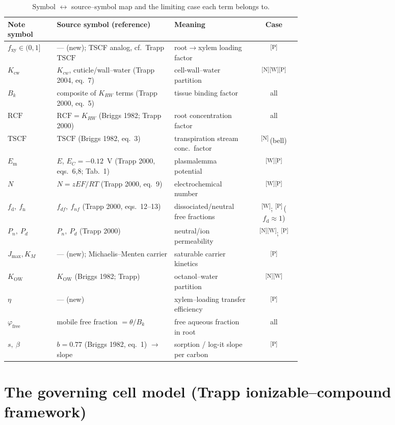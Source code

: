 \documentclass[11pt]{article}
\newcommand{\cN}{\textsuperscript{\textcolor{cNcol}{[N]}}}
\newcommand{\cW}{\textsuperscript{\textcolor{cWcol}{[W]}}}
\newcommand{\cP}{\textsuperscript{\textcolor{cPcol}{[P]}}}
\newcommand{\fxy}{\ensuremath{f_{\mathrm{xy}}}}
\newcommand{\Kcw}{\ensuremath{K_{\mathrm{cw}}}}
\newcommand{\Bk}{\ensuremath{B_{k}}}
\newcommand{\Em}{\ensuremath{E_{\mathrm{m}}}}
\newcommand{\fd}{\ensuremath{f_{\mathrm{d}}}}
\newcommand{\fnn}{\ensuremath{f_{\mathrm{n}}}}
\newcommand{\Kow}{\ensuremath{K_{\mathrm{OW}}}}
\newcommand{\TSCF}{\ensuremath{\mathrm{TSCF}}}
\newcommand{\RCF}{\ensuremath{\mathrm{RCF}}}
\newcommand{\ffree}{\ensuremath{\varphi_{\mathrm{free}}}}
\begin{document}
\begin{table}[h]
\centering\small
\renewcommand{\arraystretch}{1.15}
\caption{Symbol $\leftrightarrow$ source--symbol map and the limiting case each term belongs to.}
\label{tab:sym}
\begin{tabular}{@{}l >{\raggedright\arraybackslash}p{0.40\linewidth} >{\raggedright\arraybackslash}p{0.27\linewidth} c@{}}
\toprule
Note symbol & Source symbol (reference) & Meaning & Case\\
\midrule
$\fxy\in(0,1]$ & --- (new); TSCF analog, cf.\ Trapp \TSCF{} & root$\to$xylem loading factor & \cP\\
$\Kcw$ & $K_{cw}$, cuticle/wall--water (Trapp 2004, eq.~7) & cell-wall--water partition & \cN\cW\cP\\
$\Bk$ & composite of $K_{RW}$ terms (Trapp 2000, eq.~5) & tissue binding factor & all\\
$\RCF$ & $\RCF=K_{RW}$ (Briggs 1982; Trapp 2000) & root concentration factor & all\\
$\TSCF$ & \TSCF{} (Briggs 1982, eq.~3) & transpiration stream conc.\ factor & \cN\,(bell)\\
$\Em$ & $E$, $E_C=-0.12$~V (Trapp 2000, eqs.~6,8; Tab.~1) & plasmalemma potential & \cW\cP\\
$N$ & $N=zEF/RT$ (Trapp 2000, eq.~9) & electrochemical number & \cW\cP\\
$\fd,\ \fnn$ & $f_{df},\ f_{nf}$ (Trapp 2000, eqs.~12--13) & dissociated/neutral free fractions & \cW; \cP\,($\fd\!\approx\!1$)\\
$P_n,\ P_d$ & $P_n,\ P_d$ (Trapp 2000) & neutral/ion permeability & \cN\cW; \cP\\
$J_{\max},K_M$ & --- (new); Michaelis--Menten carrier & saturable carrier kinetics & \cP\\
$\Kow$ & $\Kow$ (Briggs 1982; Trapp) & octanol--water partition & \cN\cW\\
$\eta$ & --- (new) & xylem--loading transfer efficiency & \cP\\
$\ffree$ & mobile free fraction $=\theta/\Bk$ & free aqueous fraction in root & all\\
$s,\ \beta$ & $b=0.77$ (Briggs 1982, eq.~1) $\to$ slope & sorption / log-it slope per carbon & \cP\\
\bottomrule
\end{tabular}
\end{table}

\section{The governing cell model (Trapp ionizable--compound framework)}\label{sec:gov}
\end{document}
